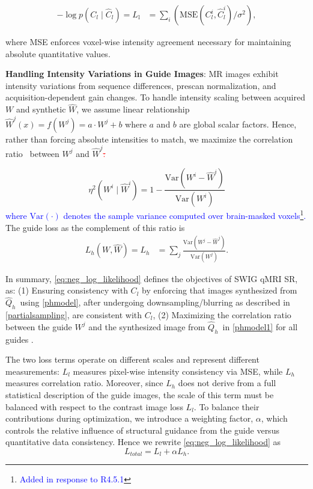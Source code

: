 \documentclass[journal,twoside,web]{ieeecolor}
\newcommand{\added}[1]{\textcolor{blue}{#1}}      %
\newcommand{\deleted}[1]{\textcolor{red}{\st{#1}}} %
\begin{document}
\begin{equation}
\begin{aligned}
    -\log p(C_l \mid \hat{C}_l) = L_{\text{l}}
    &=   \sum_{i} ( \text{MSE}(C_l^i, \hat{C}_l^i)/\sigma^2 ),
\end{aligned}
\label{hl}
\end{equation}

where MSE enforces voxel-wise intensity agreement necessary for maintaining absolute quantitative values.

\textbf{Handling Intensity Variations in Guide Images}: MR images exhibit intensity variations from sequence differences, prescan normalization, and acquisition-dependent gain changes. To handle intensity scaling between acquired $W$ and synthetic $\hat{W}$, we assume linear relationship $\hat{W}^{j}(x) = f(W^{j}) = a \cdot W^{j} + b$ where $a$ and $b$ are global scalar factors. Hence, rather than forcing absolute intensities to match, we maximize the correlation ratio~\cite{b9} between $W^j$ and $\hat{W}^j$\deleted{:}

\begin{equation}
    \eta^2(W^i \mid \hat{W}^i) = 1 - \frac{\text{Var}(W^i - \hat{W}^i)}{\text{Var}(W^i)}
\end{equation}
\added{where $\text{Var}(\cdot)$ denotes the sample variance computed over brain-masked voxels\footnote{\textcolor{blue}{Added in response to R4.5.1}}.} The guide loss as the complement of this ratio is
\begin{equation}
\begin{aligned}
    L_h(W, \hat{W}) =L_h
    &=\sum_{j}  \frac{\text{Var}(W^j - \hat{W}^j)}{\text{Var}(W^j)}.
    \label{ll}
\end{aligned}
\end{equation}




In summary, \eqref{eq:neg_log_likelihood} defines the objectives of SWIG qMRI SR, as: (1) Ensuring consistency with \( C_l \) by enforcing that images synthesized from  $\hat{Q}_h$\ using \eqref{phmodel}, after undergoing downsampling/blurring as described in \eqref{partialsampling}, are consistent with \( C_l \), (2) Maximizing the correlation ratio between the guide \( W^j \) and the synthesized image from $\hat{Q}_h$\ in \eqref{phmodel1} for all guides . 

The two loss terms operate on different scales and represent different measurements: $L_l$ measures pixel-wise intensity consistency via MSE, while $L_h$ measures correlation ratio. Moreover, since $L_h$ does not derive from a full statistical description of the guide images, the scale of this term must be balanced with respect to the contrast image loss $L_l$. To balance their contributions during optimization, we introduce a weighting factor, $\alpha$, which controls the relative influence of structural guidance from the guide versus quantitative data consistency. Hence we rewrite \eqref{eq:neg_log_likelihood} as
\begin{equation}
L_{total} =  L_l + \alpha L_h.
\label{eq:weighted_loss}
\end{equation}
\end{document}
